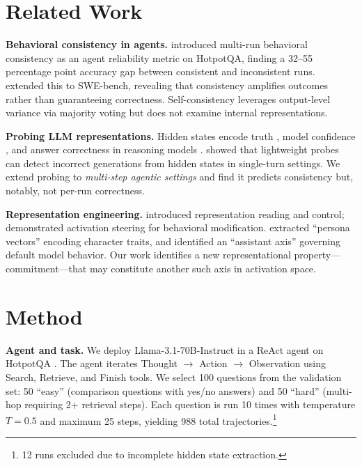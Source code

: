 \documentclass{article}
\begin{document}
\section{Related Work}

\textbf{Behavioral consistency in agents.} \citet{mehta2026agents} introduced multi-run behavioral consistency as an agent reliability metric on HotpotQA, finding a 32--55 percentage point accuracy gap between consistent and inconsistent runs. \citet{mehta2026consistency} extended this to SWE-bench, revealing that consistency amplifies outcomes rather than guaranteeing correctness. Self-consistency \citep{wang2023selfconsistency} leverages output-level variance via majority voting but does not examine internal representations.

\textbf{Probing LLM representations.} Hidden states encode truth \citep{burns2023discovering, marks2024geometry}, model confidence \citep{kadavath2022language}, and answer correctness in reasoning models \citep{stickland2024reasoning}. \citet{gnosis} showed that lightweight probes can detect incorrect generations from hidden states in single-turn settings. We extend probing to \emph{multi-step agentic settings} and find it predicts consistency but, notably, not per-run correctness.

\textbf{Representation engineering.} \citet{zou2023repe} introduced representation reading and control; \citet{turner2023steering} demonstrated activation steering for behavioral modification. \citet{anthropic_persona} extracted ``persona vectors'' encoding character traits, and \citet{anthropic_axis} identified an ``assistant axis'' governing default model behavior. Our work identifies a new representational property---commitment---that may constitute another such axis in activation space.

\section{Method}

\textbf{Agent and task.} We deploy Llama-3.1-70B-Instruct \citep{llama3} in a ReAct \citep{react} agent on HotpotQA \citep{hotpotqa}. The agent iterates Thought $\rightarrow$ Action $\rightarrow$ Observation using Search, Retrieve, and Finish tools. We select 100 questions from the validation set: 50 ``easy'' (comparison questions with yes/no answers) and 50 ``hard'' (multi-hop requiring 2+ retrieval steps). Each question is run 10 times with temperature $T{=}0.5$ and maximum 25 steps, yielding 988 total trajectories.\footnote{12 runs excluded due to incomplete hidden state extraction.}
\end{document}
